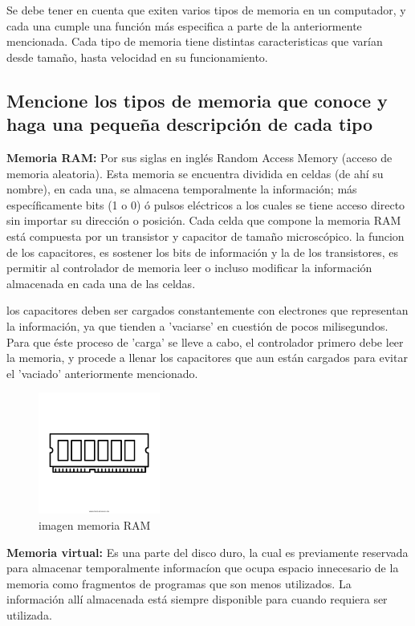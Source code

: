 \documentclass{article}
\begin{document}
Se debe tener en cuenta que exiten varios tipos de memoria en un computador, y cada una cumple una función más especifica a parte de la anteriormente mencionada. Cada tipo de memoria tiene distintas caracteristicas que varían desde tamaño, hasta velocidad en su funcionamiento.


\subsection{Mencione los tipos de memoria que conoce y haga una pequeña descripción de cada tipo}
%
\textbf{Memoria RAM:} Por sus siglas en inglés Random Access Memory (acceso de memoria aleatoria). Esta memoria se encuentra dividida en celdas (de ahí su nombre), en cada una, se almacena temporalmente la información; más específicamente bits (1 o 0) ó pulsos eléctricos a los cuales se tiene acceso directo sin importar su dirección o posición.
Cada celda que compone la memoria RAM está compuesta por un transistor y capacitor de tamaño microscópico.
la funcion de los capacitores, es sostener los bits de información y la de los transistores, es permitir al controlador de memoria leer o incluso modificar la información almacenada en cada una de las celdas.

los capacitores deben ser cargados constantemente con electrones que representan la información, ya que tienden a 'vaciarse' en cuestión de pocos milisegundos. Para que éste proceso de 'carga' se lleve a cabo, el controlador primero debe leer la memoria, y procede a llenar los capacitores que aun están cargados para evitar el 'vaciado' anteriormente mencionado.\\
%
\begin{figure}[h]
\includegraphics[width=4cm]{memoriaRAM.png}
\centering
\caption{imagen memoria RAM}
\label{fig:memoriaRAM}
\end{figure}

\textbf{Memoria virtual:} Es una parte del disco duro, la cual es previamente reservada para almacenar temporalmente informacíon que ocupa espacio innecesario de la memoria como fragmentos de programas que son menos utilizados. La información allí almacenada está siempre disponible para cuando requiera ser utilizada. 
\end{document}
